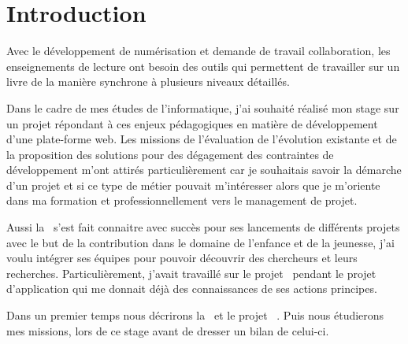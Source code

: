 \chapter*{Introduction}

Avec le développement de numérisation et demande de travail collaboration, les enseignements de lecture ont besoin des outils qui permettent de travailler sur un livre de la manière synchrone à plusieurs niveaux détaillés. 

Dans le cadre de mes études de l'informatique, j'ai souhaité réalisé mon stage sur un projet répondant à ces enjeux pédagogiques en matière de développement d'une plate-forme web. Les missions de l'évaluation de l'évolution existante et de la proposition des solutions pour des dégagement des contraintes de développement m'ont attirés particulièrement car je souhaitais savoir la démarche d'un projet et si ce type de métier pouvait m'intéresser alors que je m'oriente dans ma formation et professionnellement vers le management de projet. 

Aussi la \pe\ s'est fait connaitre avec succès pour ses lancements de différents projets avec le but de la contribution dans le domaine de l'enfance et de la jeunesse, j'ai voulu intégrer ses équipes pour pouvoir découvrir des chercheurs et leurs recherches. Particulièrement, j'avait travaillé sur le projet \ezb\ pendant le projet d'application qui me donnait déjà des connaissances de ses actions principes.

Dans un premier temps nous décrirons la \pe\ et le projet \ezb\ . Puis nous étudierons mes missions, lors de ce stage avant de dresser un bilan de celui-ci.